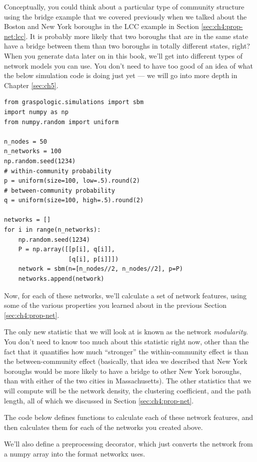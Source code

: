 Conceptually, you could think about a particular type of community structure using the bridge example that we covered previously when we talked about the Boston and New York boroughs in the LCC example in Section \ref{sec:ch4:prop-net:lcc}. It is probably more likely that two boroughs that are in the same state have a bridge between them than two boroughs in totally different states, right? When you generate data later on in this book, we'll get into different types of network models you can use. You don't need to have too good of an idea of what the below simulation code is doing just yet --- we will go into more depth in Chapter \ref{sec:ch5}.

\begin{lstlisting}[style=python]
from graspologic.simulations import sbm
import numpy as np
from numpy.random import uniform

n_nodes = 50
n_networks = 100
np.random.seed(1234)
# within-community probability
p = uniform(size=100, low=.5).round(2)
# between-community probability
q = uniform(size=100, high=.5).round(2)

networks = []
for i in range(n_networks):
    np.random.seed(1234)
    P = np.array([[p[i], q[i]],
                  [q[i], p[i]]])
    network = sbm(n=[n_nodes//2, n_nodes//2], p=P)
    networks.append(network)
\end{lstlisting}
Now, for each of these networks, we'll calculate a set of network features, using some of the various properties you learned about in the previous Section \ref{sec:ch4:prop-net}.

The only new statistic that we will look at is known as the network \textit{modularity}. You don't need to know too much about this statistic right now, other than the fact that it quantifies how much ``stronger'' the within-community effect is than the between-community effect (basically, that idea we described that New York boroughs would be more likely to have a bridge to other New York boroughs, than with either of the two cities in Massachusetts). The other statistics that we will compute will be the network density, the clustering coefficient, and the path length, all of which we discussed in Section \ref{sec:ch4:prop-net}.

The code below defines functions to calculate each of these network features, and then calculates them for each of the networks you created above.

We'll also define a preprocessing decorator, which just converts the network from a numpy array into the format networkx uses.


